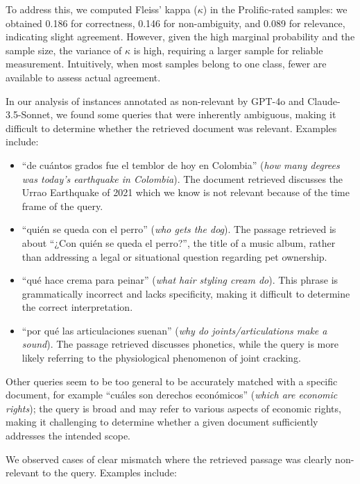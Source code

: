 \documentclass[11pt]{article}
\begin{document}
To address this, we computed Fleiss' kappa ($\kappa$) in the Prolific-rated samples: 
we obtained 0.186 for correctness, 0.146 for non-ambiguity, and 0.089 for relevance, indicating slight agreement.
However, given the high marginal probability and the sample size, the variance of $\kappa$ is high, requiring a larger sample for reliable measurement. 
Intuitively, when most samples belong to one class, fewer are available to assess actual agreement. 


In our analysis of instances annotated as non-relevant by GPT-4o and Claude-3.5-Sonnet, we found some queries that were inherently ambiguous, making it difficult to determine whether the retrieved document was relevant. Examples include: 

\begin{itemize}[wide, itemindent=, itemsep=0pt]
    \item ``de cuántos grados fue el temblor de hoy en Colombia'' (\emph{how many degrees was today's earthquake in Colombia}). The document retrieved discusses the Urrao Earthquake of 2021 which we know is not relevant because of the time frame of the query.
    
    \item ``quién se queda con el perro'' (\emph{who gets the dog}). The passage retrieved is about ``¿Con quién se queda el perro?'', the title of a music album, rather than addressing a legal or situational question regarding pet ownership.
    
    \item ``qué hace crema para peinar'' (\emph{what hair styling cream do}). This phrase is grammatically incorrect and lacks specificity, making it difficult to determine the correct interpretation.

    \item ``por qué las articulaciones suenan'' (\emph{why do joints/articulations make a sound}). The passage retrieved discusses phonetics, while the query is more likely referring to the physiological phenomenon of joint cracking.
\end{itemize}

Other queries seem to be too general to be accurately matched with a specific document, for example ``cuáles son derechos económicos'' (\emph{which are economic rights}); the query is broad and may refer to various aspects of economic rights, making it challenging to determine whether a given document sufficiently addresses the intended scope.

We observed cases of clear mismatch where the retrieved passage was clearly non-relevant to the query. Examples include:
\end{document}
